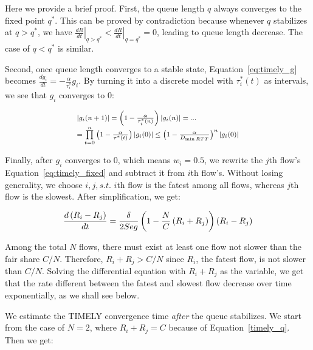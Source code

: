 Here we provide a brief proof. First, the queue length $q$ always
converges to the fixed point $q^*$. This can be proved by contradiction because whenever $q$ stabilizes
at $q>q^*$, we have ${\left. {\frac{{dR}}{{dt}}} \right|_{q > {q^*}}} < {\left. {\frac{{dR}}{{dt}}} \right|_{q = {q^*}}} = 0$, 
leading to queue length decrease. The case of $q<q^*$ is similar. 

Second, once queue length converges to a stable state, Equation~\ref{eq:timely_g} becomes
$\frac{{d{g_i}}}{{dt}} =  - \frac{\alpha }{{{\tau_i^*}}}{g_i}$. By turning it into a discrete model
with $\tau_i^*(t)$ as intervals, we see that $g_i$ converges to 0:

\begin{equation}
\small
\begin{array}{l}
\left| {{g_i}(n + 1)} \right| = \left( {1 - \frac{\alpha }{{\tau _i^*(n)}}} \right)\left| {{g_i}(n)} \right| = ...\\
 = \prod\limits_{t = 0}^n {\left( {1 - \frac{\alpha }{{{\tau ^*}(t)}}} \right)} \left| {{g_i}(0)} \right| \le {\left( {1 - \frac{\alpha }{{{D_{\min RTT}}}}} \right)^n}\left| {{g_i}(0)} \right|
\end{array}
\end{equation}

Finally, after $g_i$ converges to 0, which means $w_i=0.5$, we rewrite the $j$th flow's Equation~\ref{eq:timely_fixed} 
and subtract it from $i$th flow's. Without losing generality, we choose $i,j, s.t.$ $i$th flow is the fatest among all flows,
whereas $j$th flow is the slowest. After simplification, we get:

\begin{equation}
\small
\frac{{d\left( {{R_i} - {R_j}} \right)}}{{dt}} = \frac{\delta }{{2Seg}}\left( {1 - \frac{N}{C}\left( {{R_i} + {R_j}} \right)} \right)\left( {{R_i} - {R_j}} \right)
\end{equation}

Among the total $N$ flows, there must exist at least one flow not slower than the fair share $C/N$.
Therefore, ${{R_i} + {R_j}} > C/N$ since $R_i$, the fatest flow, is not slower than $C/N$.
Solving the differential equation with ${{R_i} + {R_j}}$ as the variable, we get that the rate 
different between the fatest and slowest flow decrease over time exponentially, as we shall see below. 

 We estimate the TIMELY convergence time {\em after}
the queue stabilizes. We start from the case of $N=2$, where $R_i + R_j = C$ because of Equation~\ref{timely_q}.
Then we get:

